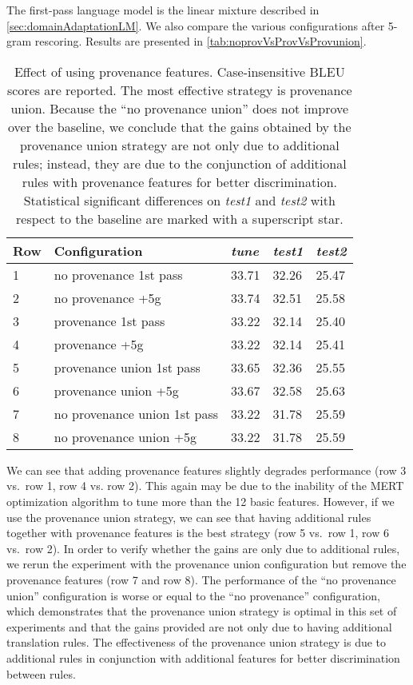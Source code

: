 The first-pass language model is the linear mixture described
in \autoref{sec:domainAdaptationLM}. We also compare
the various configurations after 5-gram rescoring.
Results are presented in \autoref{tab:noprovVsProvVsProvunion}.
%
\begin{table}
  \begin{center}
    \begin{tabular}{l|l|lll}
      Row & Configuration & \emph{tune} & \emph{test1} & \emph{test2} \\
      \hline
      1 & no provenance 1st pass & 33.71 & 32.26 & 25.47 \\
      2 & no provenance +5g           & 33.74 & 32.51 & 25.58 \\
      \hline
      3 & provenance 1st pass & 33.22 & 32.14 & 25.40 \\
      4 & provenance +5g        & 33.22 & 32.14 & 25.41 \\
      \hline
      5 & provenance union 1st pass & 33.65 & 32.36 & 25.55 \\
      6 & provenance union +5g              & 33.67 & 32.58 & 25.63 \\
      \hline
      7 & no provenance union 1st pass & 33.22 & 31.78 & 25.59 \\
      8 & no provenance union +5g      & 33.22 & 31.78 & 25.59 \\
    \end{tabular}
    \caption{Effect of using provenance features. Case-insensitive
      BLEU scores are reported. The most effective strategy is
      provenance union. Because the ``no provenance union'' does
      not improve over the baseline, we conclude that the gains
      obtained by the provenance union strategy are not only due
      to additional rules; instead, they are due to the conjunction
      of additional rules with provenance features for better discrimination.
      Statistical significant differences on \emph{test1}
      and \emph{test2} with respect to the baseline are marked
      with a superscript star.}
    \label{tab:noprovVsProvVsProvunion}
  \end{center}
\end{table}
%
We can see that adding provenance features slightly degrades
performance (row 3 vs.\ row 1, row 4 vs. row 2). This again
may be due to the inability of the MERT optimization algorithm to
tune more than the 12 basic features.
However, if we use the provenance union strategy, we can see that having additional
rules together with provenance features is the best
strategy (row 5 vs.\ row 1, row 6 vs.\ row 2).
In order to verify whether the gains are only due to additional
rules, we rerun the experiment with the provenance union configuration but
remove the provenance
features (row 7 and row 8). The performance of the ``no provenance union''
configuration is worse or equal to the ``no provenance'' configuration, which
demonstrates that the provenance union strategy is optimal in this set of experiments
and that the gains provided are not only due to having additional translation
rules. The effectiveness of the provenance union strategy is due to
additional rules in conjunction with additional features for better discrimination
between rules.

